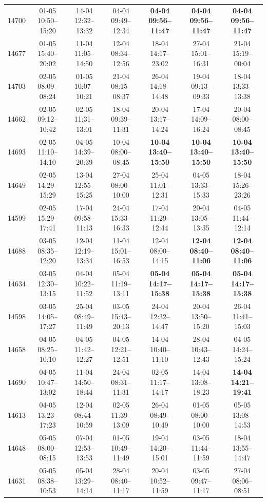 \begin{table}[htbp]
\begin{tabular}{|r|c|c|c|c|c|c|}
14700 & 01-05 10:50--15:20 & 14-04 12:32--13:32 & 04-04 09:49--12:34 & \textbf{04-04 09:56--11:47} & \textbf{04-04 09:56--11:47} & \textbf{04-04 09:56--11:47} \\ 
14677 & 01-05 15:40--20:02 & 11-04 11:05--14:50 & 12-04 08:34--12:56 & 18-04 14:17--23:02 & 27-04 15:01--16:31 & 21-04 15:19--00:04 \\ 
14703 & 02-05 08:09--08:24 & 01-05 10:07--10:21 & 21-04 08:15--08:37 & 26-04 14:18--14:48 & 19-04 09:13--09:33 & 18-04 13:33--13:38 \\ 
14662 & 02-05 09:12--10:42 & 02-05 11:31--13:01 & 18-04 09:39--11:31 & 20-04 13:17--14:24 & 17-04 14:09--16:24 & 20-04 08:00--08:45 \\ 
14693 & 02-05 11:10--14:10 & 04-05 14:39--20:39 & 10-04 08:00--08:45 & \textbf{10-04 13:40--15:50} & \textbf{10-04 13:40--15:50} & \textbf{10-04 13:40--15:50} \\ 
14649 & 02-05 14:29--15:29 & 13-04 12:55--15:25 & 27-04 08:00--10:00 & 25-04 11:01--12:31 & 04-05 13:33--15:33 & 18-04 15:26--23:26 \\ 
14599 & 02-05 15:29--17:41 & 17-04 09:58--11:13 & 24-04 15:33--16:33 & 17-04 11:29--12:44 & 20-04 13:05--13:35 & 04-05 11:44--12:14 \\ 
14688 & 03-05 08:35--12:20 & 12-04 12:19--13:34 & 11-04 15:01--16:53 & 12-04 08:00--14:15 & \textbf{12-04 08:40--11:06} & \textbf{12-04 08:40--11:06} \\ 
14634 & 03-05 12:30--13:15 & 04-04 10:22--11:52 & 05-04 11:19--13:11 & \textbf{05-04 14:17--15:38} & \textbf{05-04 14:17--15:38} & \textbf{05-04 14:17--15:38} \\ 
14598 & 03-05 14:05--17:27 & 25-04 08:49--11:49 & 03-05 15:43--20:13 & 24-04 12:32--14:47 & 20-04 13:50--15:20 & 26-04 11:41--15:03 \\ 
14658 & 04-05 08:25--10:10 & 04-05 11:42--12:27 & 04-05 12:21--12:51 & 14-04 10:40--11:10 & 28-04 10:43--12:43 & 04-05 14:24--15:24 \\ 
14690 & 04-05 10:47--13:02 & 11-04 14:50--18:44 & 24-04 08:31--11:31 & 02-05 11:17--14:17 & 14-04 13:08--18:23 & \textbf{14-04 14:21--19:41} \\ 
14613 & 04-05 13:23--17:23 & 12-04 08:44--10:59 & 02-05 11:39--13:09 & 26-04 08:49--10:49 & 01-05 08:00--10:00 & 05-05 13:08--14:53 \\ 
14648 & 05-05 08:00--08:15 & 07-04 12:53--13:53 & 01-05 10:49--11:49 & 19-04 14:20--15:01 & 03-05 11:44--11:59 & 18-04 13:55--14:47 \\ 
14631 & 05-05 08:38--10:53 & 05-04 13:29--14:14 & 28-04 08:40--11:17 & 20-04 10:52--11:59 & 03-05 09:47--11:17 & 27-04 08:06--08:51 \\ 

\end{tabular}
\end{table}
